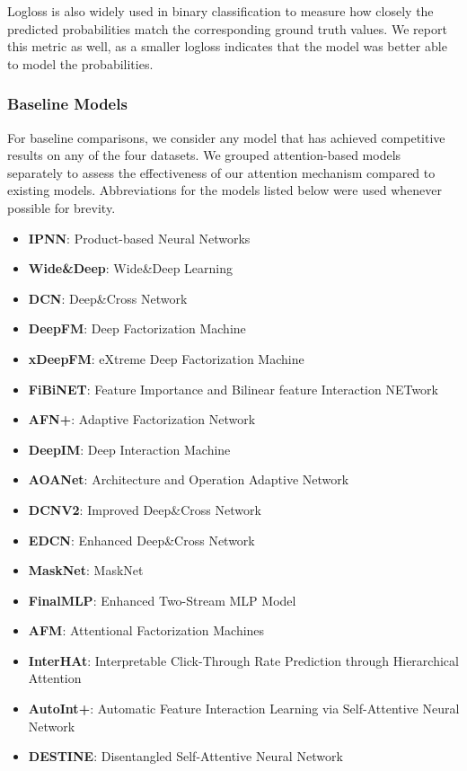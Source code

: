 \documentclass{article}
\begin{document}
Logloss is also widely used in binary classification to measure how closely the predicted probabilities match the corresponding ground truth values. We report this metric as well, as a smaller logloss indicates that the model was better able to model the probabilities.

\subsubsection{Baseline Models}

For baseline comparisons, we consider any model that has achieved competitive results on any of the four datasets. We grouped attention-based models separately to assess the effectiveness of our attention mechanism compared to existing models. Abbreviations for the models listed below were used whenever possible for brevity.

\begin{itemize}
  \item \textbf{IPNN}: Product-based Neural Networks \cite{pnn2016}
  \item \textbf{Wide\&Deep}: Wide\&Deep Learning \cite{cheng2016wide}
  \item \textbf{DCN}: Deep\&Cross Network \cite{deepcross2017}
  \item \textbf{DeepFM}: Deep Factorization Machine \cite{guo2017deepfm}
  \item \textbf{xDeepFM}: eXtreme Deep Factorization Machine \cite{lian2018xdeepfm}
  \item \textbf{FiBiNET}: Feature Importance and Bilinear feature Interaction NETwork \cite{fibinet2019}
  \item \textbf{AFN+}: Adaptive Factorization Network \cite{cheng2020adaptive}
  \item \textbf{DeepIM}: Deep Interaction Machine \cite{deepim2020}
  \item \textbf{AOANet}: Architecture and Operation Adaptive Network \cite{aoanet2020}
  \item \textbf{DCNV2}: Improved Deep\&Cross Network \cite{dcnv2}
  \item \textbf{EDCN}: Enhanced Deep\&Cross Network \cite{edcn2021}
  \item \textbf{MaskNet}: MaskNet \cite{masknet2021}
  \item \textbf{FinalMLP}: Enhanced Two-Stream MLP Model \cite{mao2023finalmlp}
  \item \textbf{AFM}: Attentional Factorization Machines \cite{afm2017}
  \item \textbf{InterHAt}: Interpretable Click-Through Rate Prediction through
Hierarchical Attention \cite{interhat2020}
  \item \textbf{AutoInt+}: Automatic Feature Interaction Learning via Self-Attentive Neural Network \cite{autoint2019}
  \item \textbf{DESTINE}: Disentangled Self-Attentive Neural Network \cite{destine2021}
\end{itemize}
\end{document}
